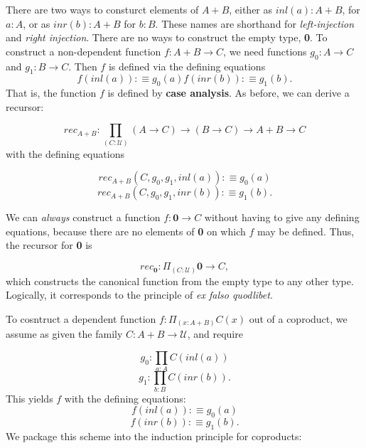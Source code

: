 \documentclass[letterpaper, 10 pt, conference]{ieeeconf}  %
\begin{document}
There are two ways to consturct elements of $A + B$, either as $inl(a) : A + B$, for $a:A$, or as $inr(b) : A + B$ for $b : B$. These names are shorthand for \textit{left-injection} and \textit{right injection}. There are no ways to construct the empty type, \textbf{0}. To construct a non-dependent function $f: A + B \rightarrow C$, we need functions $g_0: A \rightarrow C$ and $g_1: B \rightarrow C$. Then $f$ is defined via the defining equations
\begin{equation}
    f(inl(a)) :\equiv g_0(a)
    f(inr(b)) :\equiv g_1(b).
\end{equation}
That is, the function $f$ is defined by \textbf{case analysis}. As before, we can derive a recursor:

\begin{equation}
    rec_{A + B} : \prod_{(C:\mathcal{U})} (A \rightarrow C) \rightarrow (B \rightarrow C) \rightarrow A + B \rightarrow C
\end{equation}
with the defining equations

\begin{equation*}
    rec_{A+B}(C,g_0,g_1,inl(a)) :\equiv g_0(a)
\end{equation*}
\begin{equation*}
    rec_{A+B}(C,g_0,g_1,inr(b)) :\equiv g_1(b).
\end{equation*}

We can \textit{always} construct a function $f: \mathbf{0} \rightarrow C$ without having to give any defining equations, because there are no elements of \textbf{0} on which $f$ may be defined. Thus, the recursor for \textbf{0} is

\begin{equation*}
    rec_{\mathbf{0}} : \Pi_{(C:\mathcal{U})} \mathbf{0} \rightarrow C,
\end{equation*}
which constructs the canonical function from the empty type to any other type. Logically, it corresponds to the principle of \textit{ex falso quodlibet}.

To cosntruct a dependent function $f: \Pi_{(x:A+B)} C(x)$ out of a coproduct, we assume as given the family $C: A + B \rightarrow \mathcal{U}$, and require

\begin{equation*}
    g_0: \prod_{a:A}C(inl(a))
\end{equation*}
\begin{equation*}
    g_1: \prod_{b:B}C(inr(b)).
\end{equation*}
This yields $f$ with the defining equations:
\begin{equation}
    f(inl(a)) :\equiv g_0(a)
\end{equation}
\begin{equation}
    f(inr(b)) :\equiv g_1(b).
\end{equation}
We package this scheme into the induction principle for coproducts:
\end{document}
